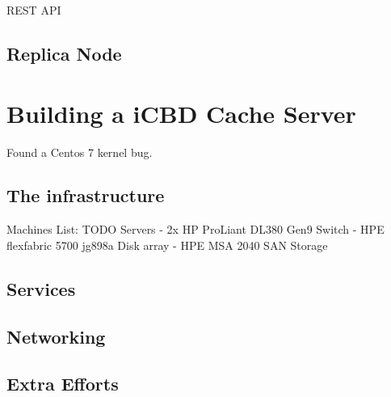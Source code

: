 REST API

\subsection{Replica Node}
\label{sub:rep_replica_node}






\section{Building a iCBD Cache Server}
\label{sec:cache_server}

Found a Centos 7 kernel bug.


\subsection{The infrastructure}
\label{sub:infrastructure}

Machines List:
TODO
Servers - 2x HP ProLiant DL380 Gen9
Switch - HPE flexfabric 5700 jg898a
Disk array - HPE MSA 2040 SAN Storage

\subsection{Services}
\label{sub:cache_services}


\subsection{Networking}
\label{sub:cache_networking}

\subsection{Extra Efforts}
\label{sub:extra_efforts}



